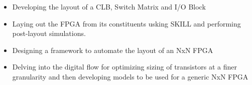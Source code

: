 \begin{itemize}

\item Developing the layout of a CLB, Switch Matrix and I/O Block

\item Laying out the FPGA from its constituents usking SKILL and performing post-layout simulations.

\item Designing a framework to automate the layout of an NxN FPGA

\item Delving into the digital flow for optimizing sizing of transistors at a finer granularity and then developing models to be used for a generic NxN FPGA
\end{itemize}
 
